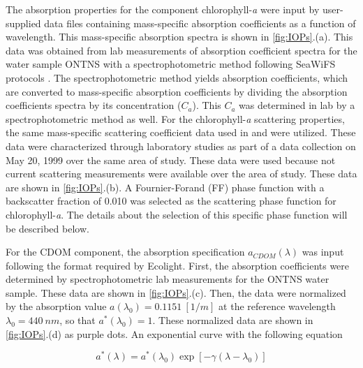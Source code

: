 \documentclass[onecolumn,3p,letterpaper]{elsarticle}
\begin{document}

The absorption properties for the component chlorophyll-{\it a} were input by user-supplied data files containing mass-specific absorption coefficients as a function of wavelength. This mass-specific absorption spectra is shown in \autoref{fig:IOPs}.(a). This data was obtained from lab measurements of absorption coefficient spectra for the water sample ONTNS with a spectrophotometric method following SeaWiFS protocols \citep{Mueller1995}. The spectrophotometric method yields absorption coefficients, which are converted to mass-specific absorption coefficients by dividing the absorption coefficients spectra by its concentration ($C_a$). This $C_a$ was determined in lab by a spectrophotometric method as well. For the chlorophyll-{\it a} scattering properties, the same mass-specific scattering coefficient data used in \citet{Raqueno:2000} and \citet{Raqueno:2003} were utilized. These data were characterized through laboratory studies as part of a data collection on May 20, 1999 over the same area of study. These data were used because not current scattering measurements were available over the area of study. These data are shown in \autoref{fig:IOPs}.(b). A Fournier-Forand (FF) phase function with a backscatter fraction of 0.010 was selected as the scattering phase function for chlorophyll-{\it a}. The details about the selection of this specific phase function will be described below.

For the CDOM component, the absorption specification $a_{CDOM}(\lambda)$ was input following the format required by Ecolight. First, the absorption coefficients were determined by spectrophotometric lab measurements for the ONTNS water sample. These data are shown in \autoref{fig:IOPs}.(c). Then, the data were normalized by the absorption value $a(\lambda_0)=0.1151~[1/m]$ at the reference wavelength $\lambda_0=440~nm$, so that $a^*(\lambda_0)=1$. These normalized data are shown in \autoref{fig:IOPs}.(d) as purple dots. An exponential curve with the following equation

\begin{equation}
	\label{eq:CDOMabs}
	a^*(\lambda)=a^*(\lambda_0)\exp{\left[-\gamma(\lambda-\lambda_0)\right]}
\end{equation}
\end{document}
